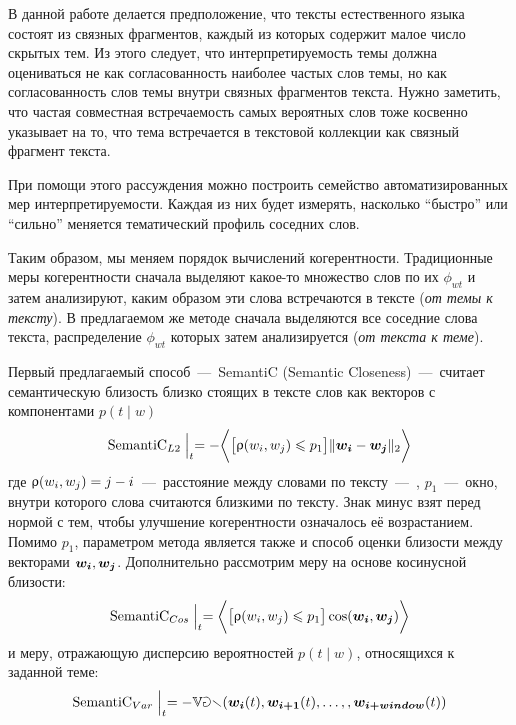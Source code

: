 В данной работе делается предположение, что тексты естественного языка состоят из связных фрагментов, каждый из которых содержит малое число скрытых тем. Из этого следует, что интерпретируемость темы должна оцениваться не как согласованность наиболее частых слов темы, но как согласованность слов темы внутри связных фрагментов текста. Нужно заметить, что частая совместная встречаемость самых вероятных слов тоже косвенно указывает на то, что тема встречается в текстовой коллекции как связный фрагмент текста.

При помощи этого рассуждения можно построить семейство автоматизированных мер интерпретируемости. Каждая из них будет измерять, насколько ``быстро'' или ``сильно'' меняется тематический профиль соседних слов. 

Таким образом, мы меняем порядок вычислений когерентности. Традиционные меры когерентности сначала выделяют какое-то множество слов по их $\phi_{wt}$ и затем анализируют, каким образом эти слова встречаются в тексте (\emph{от темы к тексту}). В предлагаемом же методе сначала выделяются все соседние слова текста, распределение $\phi_{wt}$ которых затем анализируется (\emph{от текста к теме}).

Первый предлагаемый способ~---~SemantiC (Semantic Closeness)~---~считает семантическую близость близко стоящих в тексте слов как векторов с компонентами $p(t \mid w)$
  \begin{equation}
    \text{SemantiC}_{L2} \Bigm|_{t} = -\biggl\langle\bigl[\uprho(w_i, w_j) \leqslant p_1\bigr] \|\boldsymbol{w_i}-\boldsymbol{w_j}\|_2\biggr\rangle
    \label{coh:semantic}
  \end{equation}
  где $\rho(w_i, w_j) \hm= j \hm- i$~---~расстояние между словами по тексту~---~,
  $p_1$~---~окно, внутри которого слова считаются близкими по тексту.   Знак минус взят перед нормой с тем, чтобы улучшение когерентности означалось её возрастанием.
  Помимо $p_1$, параметром метода является также и способ оценки близости между векторами
  $\boldsymbol{w_i}, \boldsymbol{w_j}$. Дополнительно рассмотрим меру на основе косинусной близости:
  \begin{equation}
    \text{SemantiC}_{Cos} \Bigm|_{t} = \biggl\langle\bigl[\uprho(w_i, w_j) \leqslant p_1\bigr] \cos(\boldsymbol{w_i},\boldsymbol{w_j})\biggr\rangle
    \label{coh:semantic_cos}
  \end{equation}
и меру, отражающую дисперсию вероятностей $p(t\mid w)$, относящихся к заданной теме:
    \begin{equation}
    \text{SemantiC}_{Var} \Bigm|_{t} = -\mathbb{Var}(\boldsymbol{w_i}(t),\boldsymbol{w_{i+1}}(t),\dots,,\boldsymbol{w_{i+window}}(t))
    \label{coh:semantic_var}
  \end{equation}


